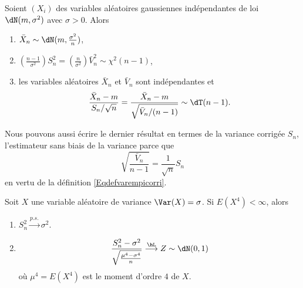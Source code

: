 \begin{theorem}     \label{ThoCochraneChiStudent}  
    Soient \( (X_i)\) des variables aléatoires gaussiennes indépendantes de loi \( \dN(m,\sigma^2)\) avec \( \sigma>0\). Alors
    \begin{enumerate}
        \item
            \( \bar X_n\sim\dN(m,\frac{ \sigma^2 }{ n })\),
        \item       \label{ItemThoCochraneChiStudentii}
            \( \left( \frac{ n-1 }{ \sigma^2 } \right)S_n^2=\left( \frac{ n }{ \sigma^2 } \right)\bar V_n^2\sim\chi^2(n-1)\),
        \item
            les variables aléatoires \( \bar X_n\) et \( \bar V_n\) sont indépendantes et
            \begin{equation}
                \frac{ \bar X_n-m }{ S_n/\sqrt{n} }=\frac{ \bar X_n-m }{ \sqrt{\bar V_n/(n-1)} }\sim\dT(n-1).
            \end{equation}
    \end{enumerate}
\end{theorem}
Nous pouvons aussi écrire le dernier résultat en termes de la variance corrigée \( S_n\), l'estimateur sans biais de la variance parce que
\begin{equation}
    \sqrt{\frac{ \bar V_n }{ n-1 }}=\frac{1}{ \sqrt{n} }S_n
\end{equation}
en vertu de la définition \eqref{Eqdefvarempicorri}.


\begin{proposition}
    Soit \( X\) une variable aléatoire de variance \( \Var(X)=\sigma\). Si \( E(X^4)<\infty\), alors
    \begin{enumerate}
        \item
            \( S_n^2\stackrel{p.s.}{\longrightarrow}\sigma^2\).
        \item
            \begin{equation}
                \frac{ S_n^2-\sigma^2 }{ \sqrt{\frac{ \mu^4-\sigma^4 }{ n }} }\stackrel{\hL}{\longrightarrow}Z\sim\dN(0,1)
            \end{equation}
            où \( \mu^4=E(X^4)\) est le moment d'ordre \( 4\) de \( X\).
    \end{enumerate}
\end{proposition}


